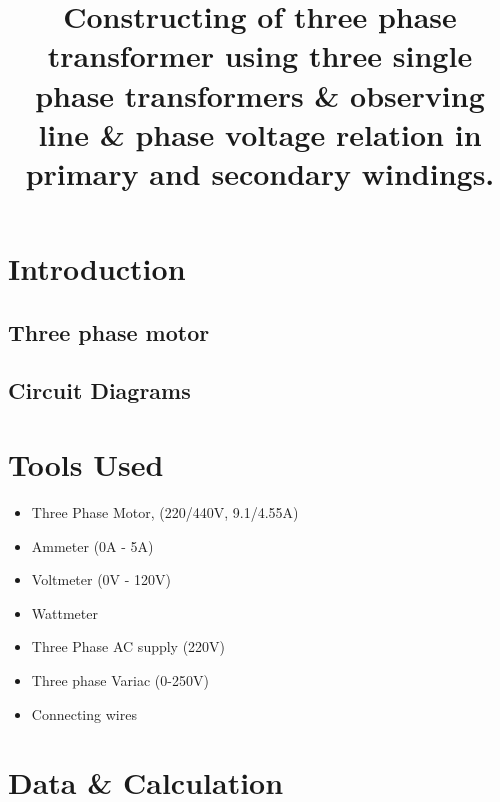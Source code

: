 \documentclass[12pt]{article}
\title{Constructing of three phase transformer using three single phase transformers
\& observing line \& phase voltage relation in primary and
secondary windings.}
\author{}
\date{}
\begin{document}

\pagebreak

\maketitle
\section{Introduction}
\subsection*{Three phase motor}


\pagebreak
\subsection*{Circuit Diagrams}


\section{Tools Used}
\begin{itemize}
    \item Three Phase Motor, (220/440V, 9.1/4.55A)
    \item Ammeter (0A - 5A)
    \item Voltmeter (0V - 120V)
    \item Wattmeter
    \item Three Phase AC supply (220V)
    \item Three phase Variac (0-250V)
    \item Connecting wires
\end{itemize}

\section{Data \& Calculation}
\end{document}
